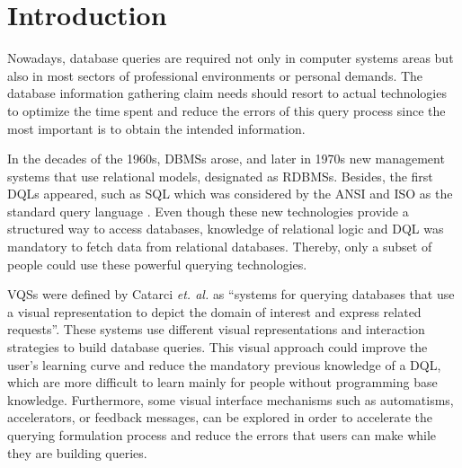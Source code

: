 \newcommand{\novathesis}{\emph{novathesis}}
\newcommand{\novathesisclass}{\texttt{novathesis.cls}}


\chapter{Introduction}
\label{cha:introduction}
Nowadays, database queries are required not only in computer systems areas but also in most sectors of professional environments or personal demands. The database information gathering claim needs should resort to actual technologies to optimize the time spent and reduce the errors of this query process since the most important is to obtain the intended information.

In the decades of the 1960s, \glspl{DBMS} arose, and later in 1970s new management systems that use relational models, designated as \glspl{RDBMS}. Besides, the first \glspl{DQL} appeared, such as \gls{SQL} \cite{sequel_aStructuredEnglishQueryLanguage} which was considered by the \gls{ANSI} and \gls{ISO} as the standard query language \cite{databaseManagementSystems}. Even though these new technologies provide a structured way to access databases, knowledge of relational logic and \gls{DQL} was mandatory to fetch data from relational databases. Thereby, only a subset of people could use these powerful querying technologies.

\Glspl{VQS} were defined by Catarci \textit{et. al.} \cite{visualQuerySystemsForDatabases_aSurvey} as “systems for querying databases that use a visual representation to depict the domain of interest and express related requests”. These systems use different visual representations and interaction strategies to build database queries. This visual approach could improve the user's learning curve and reduce the mandatory previous knowledge of a \gls{DQL}, which are more difficult to learn mainly for people without programming base knowledge. Furthermore, some visual interface mechanisms such as automatisms, accelerators, or feedback messages, can be explored in order to accelerate the querying formulation process and reduce the errors that users can make while they are building queries.

